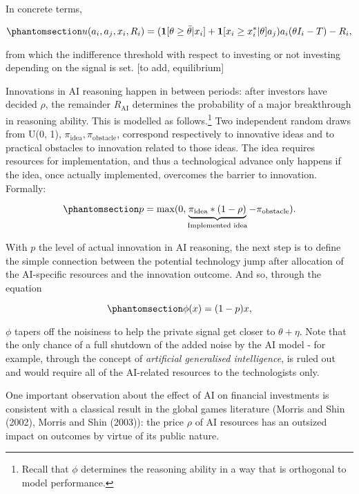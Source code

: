 \documentclass[
]{article}
\theoremstyle{plain}
\theoremstyle{remark}
\begin{document}
In concrete terms,

\begin{equation}\phantomsection\label{eq-utility}{
u(a_i, a_j, x_i, R_i) = (\mathbf{1}[\theta \geq \bar{\theta}|x_i] + \mathbf{1}[x_i \geq x_i^*|\theta]a_j)a_i(\theta I_i - T) - R_i,
}\end{equation}

from which the indifference threshold with respect to investing or not
investing depending on the signal is set. {[}to add, equilibrium{]}

Innovations in AI reasoning happen in between periods: after investors
have decided \(\rho\), the remainder \(R_{\text{AI}}\) determines the
probability of a major breakthrough in reasoning ability. This is
modelled as follows.\footnote{Recall that \(\phi\) determines the
  reasoning ability in a way that is orthogonal to model performance.}
Two independent random draws from U(0, 1),
\(\pi_{\text{idea}}, \pi_{\text{obstacle}}\), correspond respectively to
innovative ideas and to practical obstacles to innovation related to
those ideas. The idea requires resources for implementation, and thus a
technological advance only happens if the idea, once actually
implemented, overcomes the barrier to innovation. Formally:

\begin{equation}\phantomsection\label{eq-tech}{
p = \text{max}(0, \underbrace{\pi_{\text{idea}} * (1-\rho)}_{\text{Implemented idea}} - \pi_{\text{obstacle}}).
}\end{equation}

With \(p\) the level of actual innovation in AI reasoning, the next step
is to define the simple connection between the potential technology jump
after allocation of the AI-specific resources and the innovation
outcome. And so, through the equation

\begin{equation}\phantomsection\label{eq-reasoning}{
\phi(x) = (1 - p)x,
}\end{equation}

\(\phi\) tapers off the noisiness to help the private signal get closer
to \(\theta + \eta\). Note that the only chance of a full shutdown of
the added noise by the AI model - for example, through the concept of
\emph{artificial generalised intelligence}, is ruled out and would
require all of the AI-related resources to the technologists only.

One important observation about the effect of AI on financial
investments is consistent with a classical result in the global games
literature (Morris and Shin (2002), Morris and Shin (2003)): the price
\(\rho\) of AI resources has an outsized impact on outcomes by virtue of
its public nature.
\end{document}
